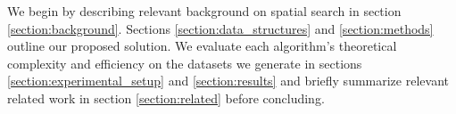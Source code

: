 {    We begin by describing relevant background on spatial search in section \ref{section:background}. Sections \ref{section:data_structures} and \ref{section:methods} outline our proposed solution. We evaluate each algorithm's theoretical complexity and efficiency on the datasets we generate in sections \ref{section:experimental_setup} and \ref{section:results} and briefly summarize relevant related work in section \ref{section:related} before concluding.
}



%



